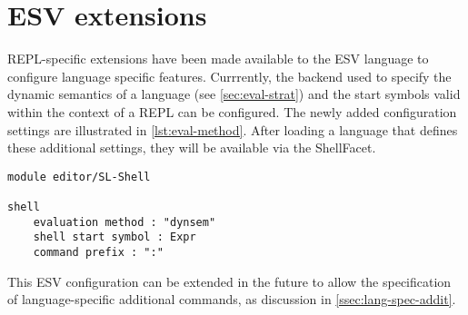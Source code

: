 \section{ESV extensions}
\label{sec:esv-extensions}

REPL-specific extensions have been made available to the ESV language to
configure language specific features. Currrently, the backend used to specify
the dynamic semantics of a language (see \cref{sec:eval-strat}) and the start
symbols valid within the context of a REPL can be configured. The newly added
configuration settings are illustrated in \cref{lst:eval-method}. After loading
a language that defines these additional settings, they will be available via
the ShellFacet.

\begin{lstlisting}[language=esv,caption={Configuring language specific settings.},label={lst:eval-method}]
module editor/SL-Shell

shell
    evaluation method : "dynsem"
    shell start symbol : Expr
    command prefix : ":"
\end{lstlisting}

This ESV configuration can be extended in the future to allow the specification
of language-specific additional commands, as discussion in
\cref{ssec:lang-spec-addit}.

